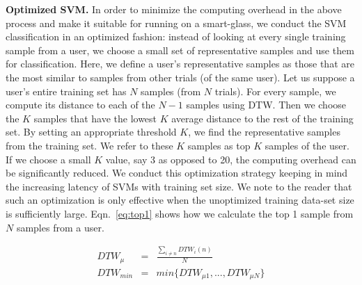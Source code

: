{\bf Optimized SVM.} In order to minimize the computing overhead in the above
process and make it suitable for running on a smart-glass, we conduct the SVM
classification in an optimized fashion:
instead of looking at every single training sample from a user, we choose a
small set of representative samples and use them for classification.
Here, we define a user's representative samples as those that
are the most similar to samples from other trials (of the same user). Let us suppose a user's
entire training set has $N$ samples (from $N$ trials). For every sample, we
compute its distance to each of the $N-1$ samples using DTW. Then we choose
the $K$ samples that have the lowest $K$ average distance to the rest of the
training set. By setting an appropriate threshold $K$, we find the
representative samples from the training set. We refer to these $K$ samples as
top $K$ samples of the user. If we choose a small $K$ value, say 3 as opposed
to 20, the computing overhead can be significantly reduced. We conduct this
optimization strategy keeping in mind the increasing latency of SVMs with
training set size. We note to the reader that such an optimization is
only effective when the unoptimized training data-set size is sufficiently
large. %
Eqn.~\ref{eq:top1} shows how we calculate the top 1 sample from $N$ samples
from a user.

\begin{eqnarray}
DTW_\mu & = &\frac{\sum_{i\neq{n}}DTW_i(n)}{N}\nonumber\\
DTW_{min} & = &min\{DTW_{\mu 1},...,DTW_{\mu N}\}
\label{eq:top1}
\end{eqnarray}



